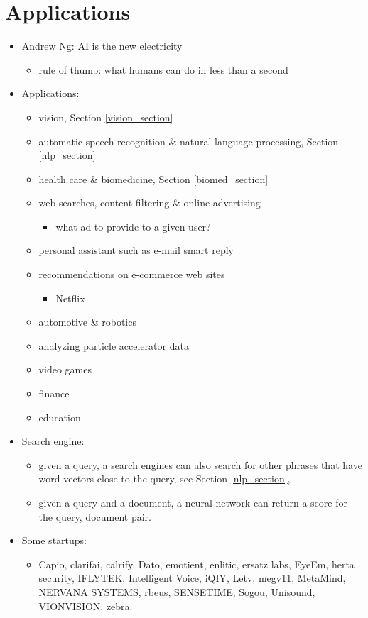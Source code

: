 \documentclass[onecolumn]{IEEEtran}
\newcommand{\bi}{\begin{itemize}}
\newcommand{\ei}{\end{itemize}}
\begin{document}
\section{Applications\label{app_section}}
\begin{itemize}
    \item Andrew Ng: AI is the new electricity
    \bi
        \item rule of thumb: what humans can do in less than a second
    \ei
    \item Applications:
    \bi
        \item vision, Section \ref{vision_section}
        \item automatic speech recognition \& natural language processing, Section \ref{nlp_section}
        \item health care \& biomedicine, Section \ref{biomed_section}
        \item web searches, content filtering \& online advertising
        \bi
            \item what ad to provide to a given user?
        \ei
        \item personal assistant such as e-mail smart reply
        \item recommendations on e-commerce web sites
        \bi
             \item Netflix
        \ei
        \item automotive \& robotics
        \item analyzing particle accelerator data
        \item video games
        \item finance
        \item education
    \ei
    \item Search engine:
    \bi
        \item given a query, a search engines can also search for other phrases that have word vectors close to the query, see Section \ref{nlp_section},
        \item given a query and a document, a neural network can return a score for the query, document pair.
    \ei
    \item Some startups:
    \bi
        \item Capio, clarifai, calrify, Dato, emotient, enlitic, ersatz labs, EyeEm, herta security, IFLYTEK, Intelligent Voice, iQIY, Letv, megv11, MetaMind, NERVANA SYSTEMS, rbeus, SENSETIME, Sogou, Unisound, VIONVISION, zebra.
    \ei
\end{itemize}
\end{document}
